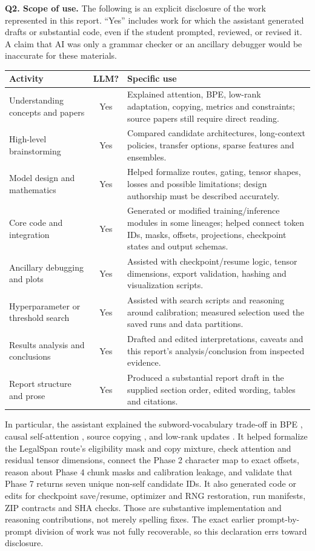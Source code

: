\documentclass[11pt,oneside]{article}
\begin{document}
\textbf{Q2. Scope of use.} The following is an explicit disclosure of the work represented in this report. ``Yes'' includes work for which the assistant generated drafts or substantial code, even if the student prompted, reviewed, or revised it. A claim that AI was only a grammar checker or an ancillary debugger would be inaccurate for these materials.
\begin{table}[H]\centering\small
\begin{tabularx}{\linewidth}{p{4.5cm}cX}\toprule Activity & LLM? & Specific use \\\midrule
Understanding concepts and papers & Yes & Explained attention, BPE, low-rank adaptation, copying, metrics and constraints; source papers still require direct reading. \\
High-level brainstorming & Yes & Compared candidate architectures, long-context policies, transfer options, sparse features and ensembles. \\
Model design and mathematics & Yes & Helped formalize routes, gating, tensor shapes, losses and possible limitations; design authorship must be described accurately. \\
Core code and integration & Yes & Generated or modified training/inference modules in some lineages; helped connect token IDs, masks, offsets, projections, checkpoint states and output schemas. \\
Ancillary debugging and plots & Yes & Assisted with checkpoint/resume logic, tensor dimensions, export validation, hashing and visualization scripts. \\
Hyperparameter or threshold search & Yes & Assisted with search scripts and reasoning around calibration; measured selection used the saved runs and data partitions. \\
Results analysis and conclusions & Yes & Drafted and edited interpretations, caveats and this report's analysis/conclusion from inspected evidence. \\
Report structure and prose & Yes & Produced a substantial report draft in the supplied section order, edited wording, tables and citations. \\
\bottomrule\end{tabularx}
\end{table}
In particular, the assistant explained the subword-vocabulary trade-off in BPE \cite{sennrich2016bpe}, causal self-attention \cite{vaswani2017attention}, source copying \cite{see2017pointer}, and low-rank updates \cite{hu2022lora}. It helped formalize the LegalSpan route's eligibility mask and copy mixture, check attention and residual tensor dimensions, connect the Phase 2 character map to exact offsets, reason about Phase 4 chunk masks and calibration leakage, and validate that Phase 7 returns seven unique non-self candidate IDs. It also generated code or edits for checkpoint save/resume, optimizer and RNG restoration, run manifests, ZIP contracts and SHA checks. Those are substantive implementation and reasoning contributions, not merely spelling fixes. The exact earlier prompt-by-prompt division of work was not fully recoverable, so this declaration errs toward disclosure.
\end{document}

